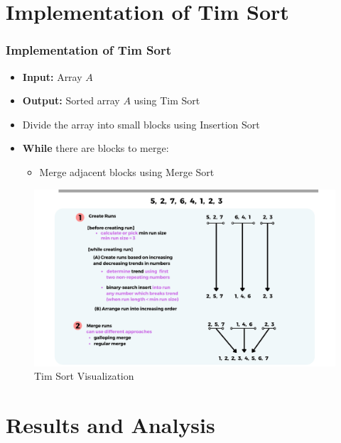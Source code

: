 \documentclass{beamer}
\begin{document}
\section{Implementation of Tim Sort}
\begin{frame}[t]
    \frametitle{Implementation of Tim Sort}

    \begin{itemize}
        \item \textbf{Input:} Array $A$
        \item \textbf{Output:} Sorted array $A$ using Tim Sort
        \item Divide the array into small blocks using Insertion Sort
        \item \textbf{While} there are blocks to merge:
              \begin{itemize}
                  \item Merge adjacent blocks using Merge Sort
              \end{itemize}
    \end{itemize}

    \begin{figure}
        \includegraphics[width=0.5\linewidth]{tim_sort.png}
        \caption{Tim Sort Visualization}
    \end{figure}
\end{frame}

\section{Results and Analysis}
\end{document}
